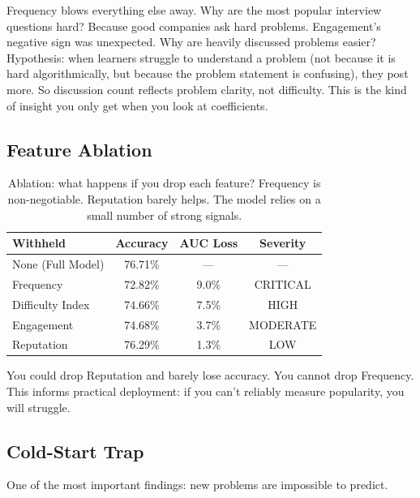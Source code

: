 \documentclass[conference]{IEEEtran}
\begin{document}
Frequency blows everything else away. Why are the most popular interview questions hard? Because good companies ask hard problems. Engagement's negative sign was unexpected. Why are heavily discussed problems easier? Hypothesis: when learners struggle to understand a problem (not because it is hard algorithmically, but because the problem statement is confusing), they post more. So discussion count reflects problem clarity, not difficulty. This is the kind of insight you only get when you look at coefficients.

\subsection{Feature Ablation}

\begin{table}[h]
\centering
\small
\begin{tabular}{l|c|c|c}
\toprule
\textbf{Withheld} & \textbf{Accuracy} & \textbf{AUC Loss} & \textbf{Severity} \\
\midrule
None (Full Model) & 76.71\% & — & — \\
Frequency & 72.82\% & 9.0\% & CRITICAL \\
Difficulty Index & 74.66\% & 7.5\% & HIGH \\
Engagement & 74.68\% & 3.7\% & MODERATE \\
Reputation & 76.29\% & 1.3\% & LOW \\
\bottomrule
\end{tabular}
\caption{Ablation: what happens if you drop each feature? Frequency is non-negotiable. Reputation barely helps. The model relies on a small number of strong signals.}
\label{tab:ablation}
\end{table}

You could drop Reputation and barely lose accuracy. You cannot drop Frequency. This informs practical deployment: if you can't reliably measure popularity, you will struggle.

\subsection{Cold-Start Trap}

One of the most important findings: new problems are impossible to predict.
\end{document}
